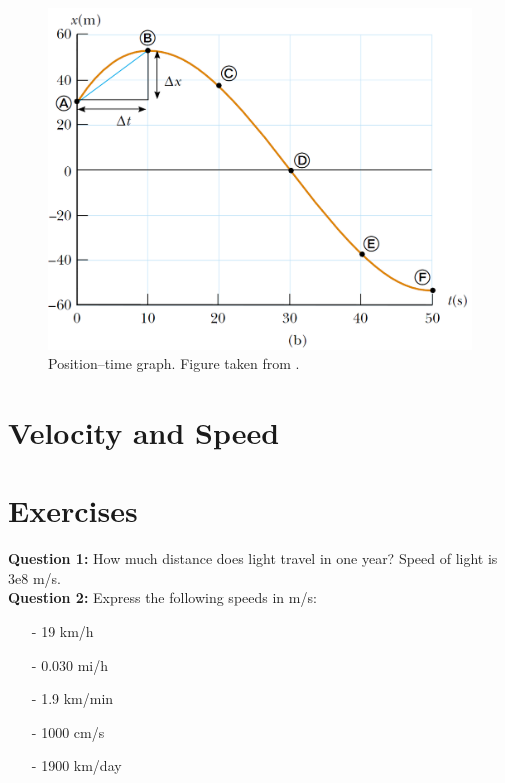 \documentclass[12pt,a4paper]{article}
\begin{document}
\begin{figure}[H]
\centering
\includegraphics[scale=0.4]{Figure2-1b.png}
\caption{Position--time graph. Figure taken from \cite[ch. 2]{Serway}.}
\label{Position-time-graph}
\end{figure}
\section{Velocity and Speed}


\section{Exercises}
\noindent\textbf{Question 1:} How much distance does light travel in one year? Speed of light is $3\mathrm{e}8$ m/s.\\
\noindent\textbf{Question 2:} Express the following speeds in m/s:\\
\begin{enumerate}
\item[-] 19 km/h
\item[-] 0.030 mi/h
\item[-] 1.9 km/min
\item[-] 1000 cm/s
\item[-] 1900 km/day
\end{enumerate}


\end{document}
